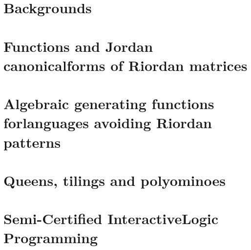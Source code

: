 \documentclass[a4paper]{tufte-book}
\begin{document}
\blankpage



\maketitle



\tableofcontents

\listoftables



\cleardoublepage

\chapter{Backgrounds}
\label{ch:backgrounds}

\chapter{Functions and Jordan canonical\newline forms of Riordan matrices}
\label{ch:Riordan-matrices-function}



\chapter{Algebraic generating functions for\newline languages avoiding Riordan patterns}
\label{ch:algebraic-gfs-languages-avoiding-Riordan-patterns}



\chapter{Queens, tilings and polyominoes}
\label{ch:queens-tilings-polyominoes}



\chapter{Semi-Certified Interactive\newline Logic Programming} 
\label{ch:scilp}






\printindex
\end{document}
